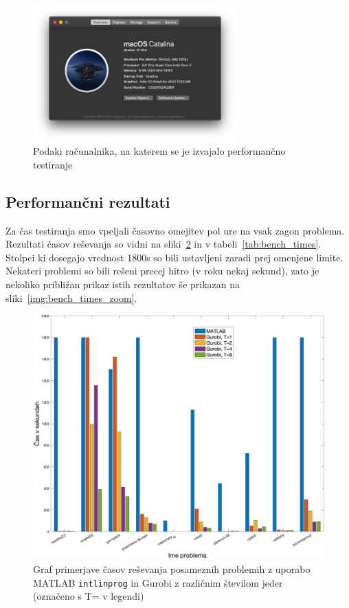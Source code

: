 \documentclass[a4paper,11pt]{article}
\begin{document}
\begin{figure}[htpb]
	\centering
	\includegraphics[width=0.7\textwidth]{images/davids-mbp.png}
	\caption{Podaki računalnika, na katerem se je izvajalo performančno testiranje}
	\label{img:davids_mbp}
\end{figure}

\subsection{Performančni rezultati}
Za čas testiranja smo vpeljali časovno omejitev pol ure na vsak zagon problema. Rezultati časov reševanja so vidni na sliki~\ref{img:bench_times} in v tabeli~\ref{tab:bench_times}. Stolpci ki dosegajo vrednost 1800s so bili ustavljeni zaradi prej omenjene limite. Nekateri problemi so bili rešeni precej hitro (v roku nekaj sekund), zato je nekoliko približan prikaz istih rezultatov še prikazan na sliki~\ref{img:bench_times_zoom}.
\begin{figure}[htpb]
	\centering
	\includegraphics[width=\textwidth]{images/benchmark_times.png}
	\caption{Graf primerjave časov reševanja posameznih problemih z uporabo MATLAB \texttt{intlinprog} in Gurobi z različnim številom jeder (označeno s T= v legendi)}
	\label{img:bench_times}
\end{figure}
\end{document}

